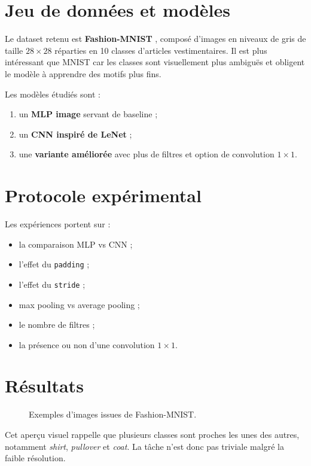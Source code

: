 \section{Jeu de données et modèles}
Le dataset retenu est \textbf{Fashion-MNIST} \citep{xiao2017fashion}, composé d’images en niveaux de gris de taille $28 \times 28$ réparties en 10 classes d’articles vestimentaires. Il est plus intéressant que MNIST car les classes sont visuellement plus ambiguës et obligent le modèle à apprendre des motifs plus fins.

Les modèles étudiés sont :
\begin{enumerate}
    \item un \textbf{MLP image} servant de baseline ;
    \item un \textbf{CNN inspiré de LeNet} ;
    \item une \textbf{variante améliorée} avec plus de filtres et option de convolution $1 \times 1$.
\end{enumerate}

\section{Protocole expérimental}
Les expériences portent sur :
\begin{itemize}[leftmargin=1.2cm]
    \item la comparaison MLP vs CNN ;
    \item l’effet du \texttt{padding} ;
    \item l’effet du \texttt{stride} ;
    \item max pooling vs average pooling ;
    \item le nombre de filtres ;
    \item la présence ou non d’une convolution $1 \times 1$.
\end{itemize}

\section{Résultats}
\begin{figure}[H]
    \centering
    \caption{Exemples d’images issues de Fashion-MNIST.}
\end{figure}
Cet aperçu visuel rappelle que plusieurs classes sont proches les unes des autres, notamment \emph{shirt}, \emph{pullover} et \emph{coat}. La tâche n’est donc pas triviale malgré la faible résolution.

